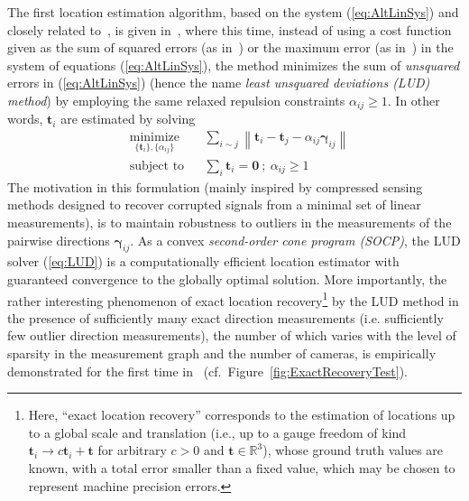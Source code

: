\documentclass[10pt]{article}
\newcommand{\R}{\ensuremath{\mathbb{R}}}
\begin{document}
The first location estimation algorithm, based on the system (\ref{eq:AltLinSys}) and closely related to~\cite{TronVidalJournal,MoulonLinfty}, is given in~\cite{LUD}, where this time, instead of using a cost function given as the sum of squared errors (as in~\cite{TronVidalJournal}) or the maximum error (as in~\cite{MoulonLinfty}) in the system of equations (\ref{eq:AltLinSys}), the method minimizes the sum of \textit{unsquared} errors in (\ref{eq:AltLinSys}) (hence the name \textit{least unsquared deviations (LUD) method}) by employing the same relaxed repulsion constraints $\alpha_{ij}\geq1$. In other words, $\mathbf{t}_i$ are estimated by solving
\begin{equation}
\label{eq:LUD}
\begin{aligned}
&\underset{{\scriptstyle \{\mathbf{t}_i\}, \{\alpha_{ij}\}}}{\text{minimize}}
& & \sum_{i\sim j}  \left\| \mathbf{t}_i-\mathbf{t}_j - \alpha_{ij}\mathbf{\gamma}_{ij} \right\| \\
& \text{subject to}
& & \sum_{i} \mathbf{t}_i = \mathbf{0} \ ; \ \alpha_{ij}\geq 1
\end{aligned}
\end{equation}
The motivation in this formulation (mainly inspired by compressed sensing methods designed to recover corrupted signals from a minimal set of linear measurements), is to maintain robustness to outliers in the measurements of the pairwise directions $\mathbf{\gamma}_{ij}$. As a convex \textit{second-order cone program (SOCP)}, the LUD solver (\ref{eq:LUD}) is a computationally efficient location estimator with guaranteed convergence to the globally optimal solution. More importantly, the rather interesting phenomenon of exact location recovery\footnote{Here, ``exact location recovery'' corresponds to the estimation of locations up to a global scale and translation (i.e., up to a gauge freedom of kind $\mathbf{t}_i\rightarrow c\mathbf{t}_i + \mathbf{t}$ for arbitrary $c>0$ and $\mathbf{t}\in\R^3$), whose ground truth values are known, with a total error smaller than a fixed value, which may be chosen to represent machine precision errors.} by the LUD method in the presence of sufficiently many exact direction measurements (i.e. sufficiently few outlier direction measurements), the number of which varies with the level of sparsity in the measurement graph and the number of cameras, is empirically demonstrated for the first time  in~\cite{LUD} (cf.~Figure~\ref{fig:ExactRecoveryTest}). 
\end{document}
